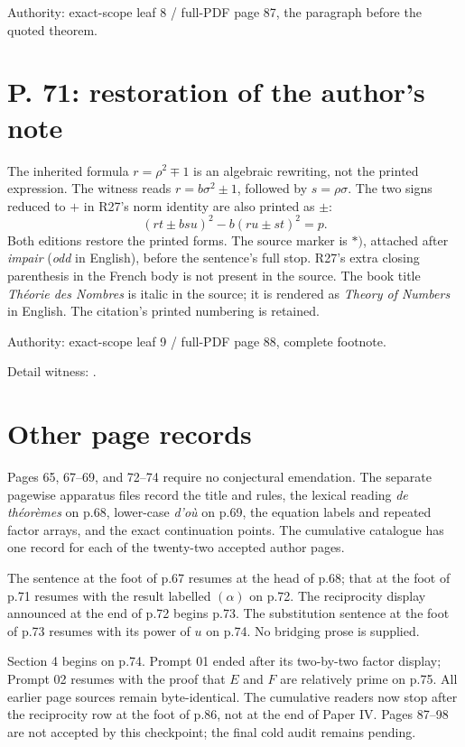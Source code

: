 \documentclass[11pt]{article}
\begin{document}
Authority: exact-scope leaf 8 / full-PDF page 87, the paragraph before the quoted theorem.

\newpage
\section*{P. 71: restoration of the author’s note}
The inherited formula $r=\rho^2\mp1$ is an algebraic rewriting, not the printed
expression. The witness reads $r=b\sigma^2\pm1$, followed by $s=\rho\sigma$.
The two signs reduced to $+$ in R27’s norm identity are also printed as $\pm$:
\[
(rt\pm bsu)^2-b(ru\pm st)^2=p.
\]
Both editions restore the printed forms. The source marker is $*)$, attached after
\emph{impair} (\emph{odd} in English), before the sentence’s full stop. R27’s extra
closing parenthesis in the French body is not present in the source. The book title
\emph{Théorie des Nombres} is italic in the source; it is rendered as
\emph{Theory of Numbers} in English. The citation’s printed numbering is retained.

Authority: exact-scope leaf 9 / full-PDF page 88, complete footnote.

Detail witness: .

\section*{Other page records}
Pages 65, 67–69, and 72–74 require no conjectural emendation. The separate pagewise
apparatus files record the title and rules, the lexical reading \emph{de théorèmes}
on p.68, lower-case \emph{d’où} on p.69, the equation labels and repeated factor
arrays, and the exact continuation points. The cumulative catalogue has one record for each
of the twenty-two accepted author pages.

The sentence at the foot of p.67 resumes at the head of p.68; that at the foot of
p.71 resumes with the result labelled $(\alpha)$ on p.72. The reciprocity display
announced at the end of p.72 begins p.73. The substitution sentence at the foot of
p.73 resumes with its power of $u$ on p.74. No bridging prose is supplied.

Section 4 begins on p.74. Prompt 01 ended after its two-by-two factor display;
Prompt 02 resumes with the proof that $E$ and $F$ are relatively prime on p.75.
All earlier page sources remain byte-identical. The cumulative readers now stop
after the reciprocity row at the foot of p.86, not at the end of Paper IV.
Pages 87–98 are not accepted by this checkpoint; the final cold audit remains pending.
\end{document}

